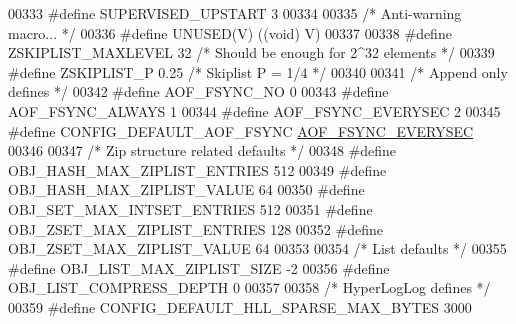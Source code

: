 \begin{DoxyCode}
{{{{{{00333 \textcolor{preprocessor}{#}\textcolor{preprocessor}{define} \textcolor{preprocessor}{SUPERVISED\_UPSTART} 3
00334 
00335 \textcolor{comment}{/* Anti-warning macro... */}
00336 \textcolor{preprocessor}{#}\textcolor{preprocessor}{define} \textcolor{preprocessor}{UNUSED}\textcolor{preprocessor}{(}\textcolor{preprocessor}{V}\textcolor{preprocessor}{)} \textcolor{preprocessor}{(}\textcolor{preprocessor}{(}\textcolor{keywordtype}{void}\textcolor{preprocessor}{)} \textcolor{preprocessor}{V}\textcolor{preprocessor}{)}
00337 
00338 \textcolor{preprocessor}{#}\textcolor{preprocessor}{define} \textcolor{preprocessor}{ZSKIPLIST\_MAXLEVEL} 32 \textcolor{comment}{/* Should be enough for 2^32 elements */}
00339 \textcolor{preprocessor}{#}\textcolor{preprocessor}{define} \textcolor{preprocessor}{ZSKIPLIST\_P} 0.25      \textcolor{comment}{/* Skiplist P = 1/4 */}
00340 
00341 \textcolor{comment}{/* Append only defines */}
00342 \textcolor{preprocessor}{#}\textcolor{preprocessor}{define} \textcolor{preprocessor}{AOF\_FSYNC\_NO} 0
00343 \textcolor{preprocessor}{#}\textcolor{preprocessor}{define} \textcolor{preprocessor}{AOF\_FSYNC\_ALWAYS} 1
00344 \textcolor{preprocessor}{#}\textcolor{preprocessor}{define} \textcolor{preprocessor}{AOF\_FSYNC\_EVERYSEC} 2
00345 \textcolor{preprocessor}{#}\textcolor{preprocessor}{define} \textcolor{preprocessor}{CONFIG\_DEFAULT\_AOF\_FSYNC} \hyperlink{server_8h_a9784233b87ec796d0343556106fb778e}{AOF\_FSYNC\_EVERYSEC}
00346 
00347 \textcolor{comment}{/* Zip structure related defaults */}
00348 \textcolor{preprocessor}{#}\textcolor{preprocessor}{define} \textcolor{preprocessor}{OBJ\_HASH\_MAX\_ZIPLIST\_ENTRIES} 512
00349 \textcolor{preprocessor}{#}\textcolor{preprocessor}{define} \textcolor{preprocessor}{OBJ\_HASH\_MAX\_ZIPLIST\_VALUE} 64
00350 \textcolor{preprocessor}{#}\textcolor{preprocessor}{define} \textcolor{preprocessor}{OBJ\_SET\_MAX\_INTSET\_ENTRIES} 512
00351 \textcolor{preprocessor}{#}\textcolor{preprocessor}{define} \textcolor{preprocessor}{OBJ\_ZSET\_MAX\_ZIPLIST\_ENTRIES} 128
00352 \textcolor{preprocessor}{#}\textcolor{preprocessor}{define} \textcolor{preprocessor}{OBJ\_ZSET\_MAX\_ZIPLIST\_VALUE} 64
00353 
00354 \textcolor{comment}{/* List defaults */}
00355 \textcolor{preprocessor}{#}\textcolor{preprocessor}{define} \textcolor{preprocessor}{OBJ\_LIST\_MAX\_ZIPLIST\_SIZE} \textcolor{preprocessor}{-}2
00356 \textcolor{preprocessor}{#}\textcolor{preprocessor}{define} \textcolor{preprocessor}{OBJ\_LIST\_COMPRESS\_DEPTH} 0
00357 
00358 \textcolor{comment}{/* HyperLogLog defines */}
00359 \textcolor{preprocessor}{#}\textcolor{preprocessor}{define} \textcolor{preprocessor}{CONFIG\_DEFAULT\_HLL\_SPARSE\_MAX\_BYTES} 3000
}}}}}}
\end{DoxyCode}

